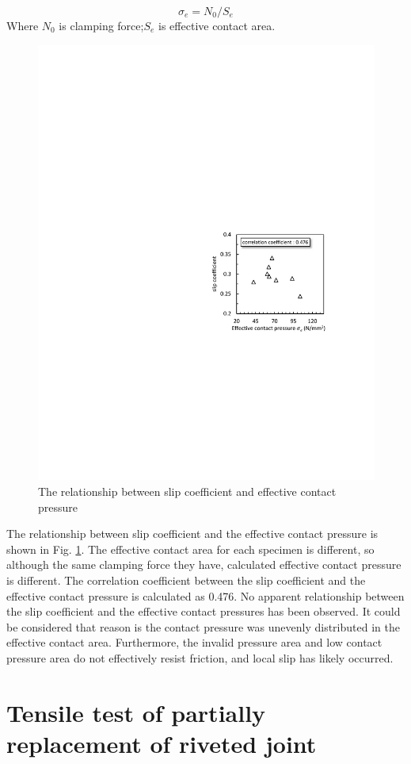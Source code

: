 \begin{equation}
    σ_e=N_0/S_e
\end{equation}
Where $N_0$ is clamping force;$ S_e$ is effective contact area. 

\begin{figure}[htbp]
\centering
\includegraphics[width=0.65\linewidth]{imgs/ch3/fig14.pdf}
\caption{The relationship between slip coefficient and effective contact pressure}
\label{ch3fig14}  
\end{figure}

The relationship between slip coefficient and the effective contact pressure is shown in Fig. \ref{ch3fig14}. The effective contact area for each specimen is different, so although the same clamping force they have, calculated effective contact pressure is different. The correlation coefficient between the slip coefficient and the effective contact pressure is calculated as 0.476. No apparent relationship between the slip coefficient and the effective contact pressures has been observed. It could be considered that reason is the contact pressure was unevenly distributed in the effective contact area. Furthermore, the invalid pressure area and low contact pressure area do not effectively resist friction, and local slip has likely occurred. 




\section{Tensile test of partially replacement of riveted joint}


